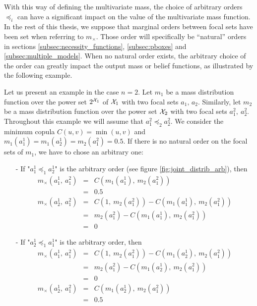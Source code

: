 With this way of defining the multivariate mass, the choice of arbitrary orders $\preceq_i$ can have a significant impact on the value of the multivariate mass function. In the rest of this thesis, we suppose that marginal orders between focal sets have been set when referring to $m_\times$. Those order will specifically be ``natural'' orders in sections \ref{subsec:necessity_functions}, \ref{subsec:pboxes} and \ref{subsec:multiple_models}. When no natural order exists, the arbitrary choice of the order can greatly impact the output mass or belief functions, as illustrated by the following example.

\begin{example}\label{ex:joint_mass}
    Let us present an example in the case $n=2$. Let $m_1$ be a mass distribution function over the power set $2^{{\mathcal{X}}_1}$ of ${\mathcal{X}}_1$ with two focal sets $a_1,\, a_2$. Similarly, let $m_2$ be a mass distribution function over the power set ${\mathcal{X}}_2$ with two focal sets $a_1^2,~a_2^2$. Throughout this example we will assume that $a_1^2\preceq_2a_2^2$. We consider the minimum copula $C(u,v)=\min(u,v)$ and $m_1(a_1^1)=m_1(a_2^1)=m_2(a_1^2)=0.5$.
    If there is no natural order on the focal sets of $m_1$, we have to chose an arbitrary one:
    \begin{itemize}
        \item[-] If "$a_1^1\preceq_1a_2^1$" is the arbitrary order (see figure \ref{fig:joint_distrib_arb}), then
        \begin{eqnarray*}
            m_\times(a_1^1,~a_1^2) &=& C(m_1(a_1^1),~m_2(a_1^2))\\
            &=& 0.5\\
            m_\times(a_2^1,~a_1^2) &=& C(1,~m_2(a_1^2)) - C(m_1(a_1^1),~m_2(a_1^2))\\
            &=& m_2(a_1^2) - C(m_1(a_1^1),~m_2(a_1^2))\\
            &=& 0
        \end{eqnarray*}
        \item[-] If "$a_2^1\preceq_1a_1^1$" is the arbitrary order, then
        \begin{eqnarray*}
            m_\times(a_1^1,~a_1^2) &=& C(1,~m_2(a_1^2)) - C(m_1(a_2^1),~m_2(a_1^2))\\
            &=& m_2(a_1^2) - C(m_1(a_2^1),~m_2(a_1^2))\\
            &=& 0\\
            m_\times(a_2^1,~a_1^2) &=& C(m_1(a_2^1),~m_2(a_1^2))\\
            &=& 0.5

\end{eqnarray*}
\end{itemize}
\end{example}
